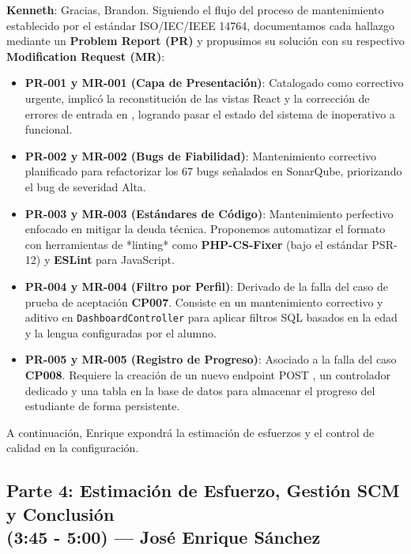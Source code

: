 \documentclass[12pt]{article}
\begin{document}
\noindent \textbf{Kenneth}: Gracias, Brandon. Siguiendo el flujo del proceso de mantenimiento establecido por el estándar ISO/IEC/IEEE 14764, documentamos cada hallazgo mediante un \textbf{Problem Report (PR)} y propusimos su solución con su respectivo \textbf{Modification Request (MR)}:

\begin{itemize}
    \item \textbf{PR-001 y MR-001 (Capa de Presentación)}: Catalogado como correctivo urgente, implicó la reconstitución de las vistas React y la corrección de errores de entrada en , logrando pasar el estado del sistema de inoperativo a funcional.
    \item \textbf{PR-002 y MR-002 (Bugs de Fiabilidad)}: Mantenimiento correctivo planificado para refactorizar los 67 bugs señalados en SonarQube, priorizando el bug de severidad Alta.
    \item \textbf{PR-003 y MR-003 (Estándares de Código)}: Mantenimiento perfectivo enfocado en mitigar la deuda técnica. Proponemos automatizar el formato con herramientas de *linting* como \textbf{PHP-CS-Fixer} (bajo el estándar PSR-12) y \textbf{ESLint} para JavaScript.
    \item \textbf{PR-004 y MR-004 (Filtro por Perfil)}: Derivado de la falla del caso de prueba de aceptación \textbf{CP007}. Consiste en un mantenimiento correctivo y aditivo en \texttt{DashboardController} para aplicar filtros SQL basados en la edad y la lengua configuradas por el alumno.
    \item \textbf{PR-005 y MR-005 (Registro de Progreso)}: Asociado a la falla del caso \textbf{CP008}. Requiere la creación de un nuevo endpoint POST , un controlador dedicado y una tabla en la base de datos para almacenar el progreso del estudiante de forma persistente.
\end{itemize}

A continuación, Enrique expondrá la estimación de esfuerzos y el control de calidad en la configuración.

\newpage

\subsection{Parte 4: Estimación de Esfuerzo, Gestión SCM y Conclusión \texorpdfstring{\\}{---} (3:45 - 5:00) --- José Enrique Sánchez}
\end{document}
